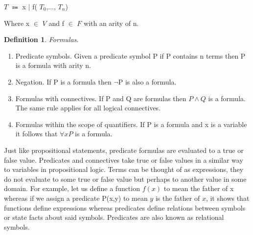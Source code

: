 \documentclass{article}%
\newtheorem{definition}{Definition}
\begin{document}
\centerline{$T$ $\Coloneqq$ x $\vert$ f( $T_0$,..., $T_n$) }

Where x $\in$ $V$ and f $\in$ $F$ with an arity of n. 
\begin{definition}
Formulas. 
\end{definition}
\begin{enumerate}
\item Predicate symbols. Given a predicate symbol P  if P contains n terms then P is a formula with arity n. 
\item Negation. If P is a formula then $\neg$P is also a formula. 
\item Formulas with connectives. If P and Q are formulas then $P \land Q$ is a formula. The same rule applies for all logical connectives. 
\item Formulas within the scope of quantifiers. If P is a formula and x is a variable it follows that $\forall{x}P$ is a formula.
\end{enumerate}
Just like propositional statements, predicate formulas are evaluated to a true or false value. Predicates and connectives take true or false values in a similar way to variables in propositional logic. Terms can be thought of as expressions, they do not evaluate to some true or false value but perhaps to another value in some domain. For example, let us define a function $f(x)$ to mean the father of x whereas if we assign a predicate P(x,y) to mean $y$ is the father of $x$, it shows that functions define expressions \cite{struth_2019} whereas predicates define relations between symbols or state facts about said symbols. Predicates are also known as relational symbols. 
\end{document}
